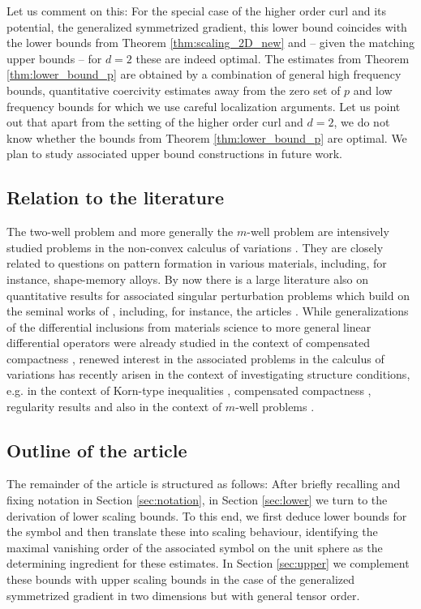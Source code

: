 \documentclass[a4paper, 10pt, twoside, notitlepage]{amsart}
\theoremstyle{plain}
\begin{document}
	Let us comment on this: For the special case of the higher order curl and its potential, the generalized symmetrized gradient, this lower bound coincides with the lower bounds from Theorem \ref{thm:scaling_2D_new} and -- given the
	matching upper bounds -- for $d=2$ these are indeed optimal. The estimates from Theorem \ref{thm:lower_bound_p} are obtained by a combination of general high frequency bounds, quantitative coercivity estimates away from the zero
	set of $p$ and low frequency bounds for which we use careful localization arguments. Let us point out that apart from the setting of the higher order curl and $d=2$, we do not know whether
	the bounds from Theorem \ref{thm:lower_bound_p} are optimal. We plan to study associated upper bound constructions in future work.
	
	
	
	
	\subsection{Relation to the literature}
	The two-well problem and more generally the $m$-well problem are intensively studied problems in the non-convex calculus of variations \cite{M1, DaM12, K1,KMS03, CK00,Ri18}. They are closely
	related to questions on pattern formation in various materials, including, for instance, shape-memory alloys. By now there is a large literature also on quantitative results for associated
	singular perturbation problems which build on the seminal works of \cite{KM92,KM94}, including, for instance, the articles \cite{AKKR22,CC15,CDMZ20,CZ16,CT05, CKZ17, CDPRZZ20, CO12, CO09,
		GZ23, KK11, KKO13,R16, RTZ19, RT22,RTrib22, RT23}.  While generalizations of the differential inclusions from materials science to more general linear differential operators were already
	studied in the context of compensated compactness \cite{T79,T93,T05,Mur81,FM99,Dac82}, renewed interest in the associated problems in the calculus of variations has recently arisen in the context of investigating
	structure conditions, e.g. in the context of Korn-type inequalities \cite{GLN22}, compensated compactness \cite{GR22, GRS22, KR22, Rai19}, regularity results \cite{CG22} and also in the context of $m$-well
	problems \cite{DPPR18,RRT22,ST23}.
	
	
	
	
	
	\subsection{Outline of the article}
	The remainder of the article is structured as follows: After briefly recalling and fixing notation in Section \ref{sec:notation}, in Section \ref{sec:lower} we turn to the derivation of lower
	scaling bounds. To this end, we first deduce lower bounds for the symbol and then translate these into scaling behaviour, identifying the maximal vanishing order of the associated symbol on the unit sphere as the determining ingredient
	for these estimates. In Section \ref{sec:upper} we complement these bounds with upper scaling bounds in the case of the generalized symmetrized gradient in two dimensions but with general
	tensor order.
	
\end{document}
